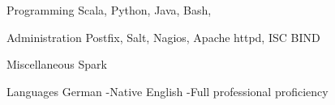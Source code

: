 

\begin{cvskills}

  \cvskill
    {Programming} %
    {Scala, Python, Java, Bash, \LaTeXe} %

  \cvskill
    {Administration} %
    {Postfix, Salt, Nagios, Apache httpd, ISC BIND} %

  \cvskill
    {Miscellaneous} %
    {Spark} %

  \cvskill
    {Languages} %
    {German \hspace{1mm}-\hspace{1mm}Native} %
  \cvskill
    {} %
    {English \hspace{2.1mm}-\hspace{1mm}Full professional proficiency} %

\end{cvskills}
